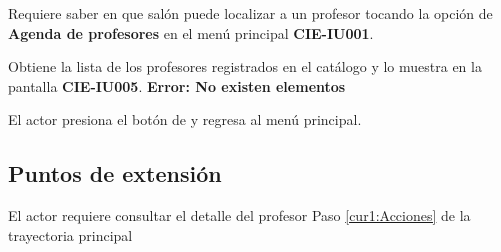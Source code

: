  \begin{UCtrayectoria}
    \UCpaso[\UCactor] Requiere saber en que salón puede localizar a un profesor tocando la opción de \textbf{Agenda de profesores} en el menú principal \textbf{CIE-IU001}.
    
    \UCpaso[\UCsist] Obtiene la lista de los profesores registrados en el catálogo y lo muestra en la pantalla \textbf{CIE-IU005}. \textbf{Error: No existen elementos}  \label{cur1:Acciones}

	\UCpaso[\UCactor] El actor presiona el botón de  y regresa al menú principal.
 \end{UCtrayectoria}

%   
%    
%   
% 
% 	
% 	

 
\subsection{Puntos de extensión}

\UCExtensionPoint
{El actor requiere consultar el detalle del profesor  }
{ Paso \ref{cur1:Acciones} de la trayectoria principal}
{}

 